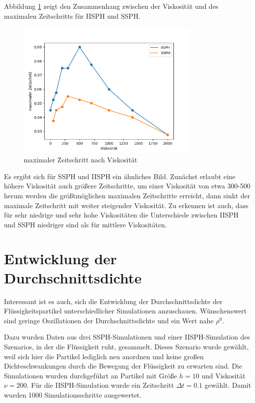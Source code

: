 \documentclass[11pt,
a4paper,
parskip=half, %
BCOR=10mm, %
english,
ngerman]{scrreprt}
\begin{document}
Abbildung \ref{image:viscosity_timestep} zeigt den Zusammenhang zwischen der Viskosität und des maximalen Zeitschritts für IISPH und SSPH.

\begin{figure}[htb]
    \includegraphics[width=0.8\textwidth]{viscosity_timestep.png}
    \caption{maximaler Zeitschritt nach Viskosität}
    \label{image:viscosity_timestep}
\end{figure}

Es ergibt sich für SSPH und IISPH ein ähnliches Bild.
Zunächst erlaubt eine höhere Viskosität auch größere Zeitschritte, um einer Viskosität von etwa 300-500 herum werden die größtmöglichen maximalen Zeitschritte erreicht,
dann sinkt der maximale Zeitschritt mit weiter steigender Viskosität.
Zu erkennen ist auch, dass für sehr niedrige und sehr hohe Viskositäten die Unterschiede zwischen IISPH und SSPH niedriger sind als für mittlere Viskositäten.


\section{Entwicklung der Durchschnittsdichte}
Interessant ist es auch, sich die Entwicklung der Durchschnittsdichte der Flüssigkeitspartikel unterschiedlicher Simulationen anzuschauen.
Wünschenswert sind geringe Oszillationen der Durchschnittsdichte und ein Wert nahe $\rho^0$.

Dazu wurden Daten aus drei SSPH-Simulationen und einer IISPH-Simulation des Szenarios, in der die Flüssigkeit ruht, gesammelt.
Dieses Szenario wurde gewählt, weil sich hier die Partikel lediglich neu anordnen und keine großen Dichteschwankungen durch die Bewegung der Flüssigkeit zu erwarten sind.
Die Simulationen wurden durchgeführt an Partikel mit Größe $h=10$ und Viskosität $\nu = 200$.
Für die IISPH-Simulation wurde ein Zeitschritt $\Delta t = 0.1$ gewählt.
Damit wurden 1000 Simulationsschritte ausgewertet.
\end{document}
